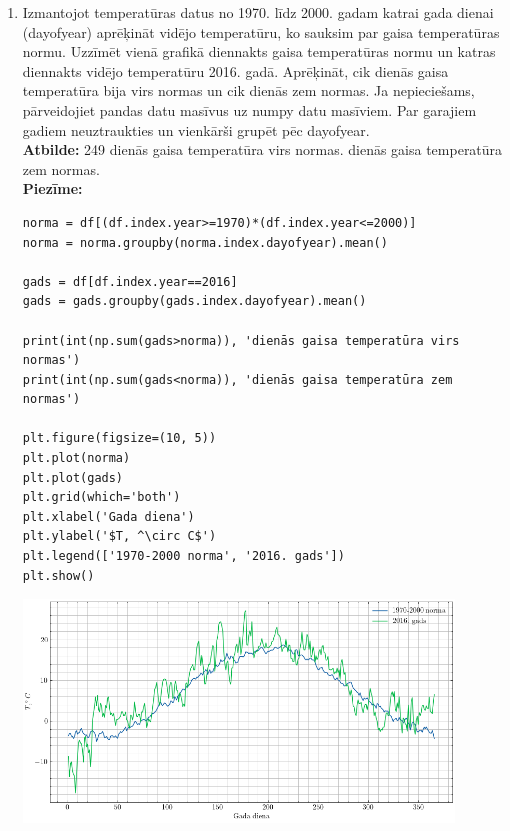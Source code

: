 \documentclass[12pt]{article}
\begin{document}
\begin{enumerate}
        \textbf{Piezīme:}
\begin{verbatim}
df2 = df.resample('d').max()
df2 = df2.resample('y').mean()

plt.figure(figsize=(5,5))
plt.plot(df2)
plt.grid(which='both')
plt.xlabel('Gads')
plt.ylabel('$T, ^\circ C$')
plt.show()
\end{verbatim}
        \item Izmantojot temperatūras datus no 1970. līdz 2000. gadam katrai gada dienai (dayofyear) aprēķināt vidējo temperatūru, ko sauksim par gaisa temperatūras normu. Uzzīmēt vienā grafikā diennakts gaisa temperatūras normu un katras diennakts vidējo temperatūru 2016. gadā. Aprēķināt, cik dienās gaisa temperatūra bija virs normas un cik dienās zem normas. Ja nepieciešams, pārveidojiet pandas datu masīvus uz numpy datu masīviem. Par garajiem gadiem neuztraukties un vienkārši grupēt pēc dayofyear.\\

        \textbf{Atbilde:} 249 dienās gaisa temperatūra virs normas.  dienās gaisa temperatūra zem normas.\\
        \textbf{Piezīme:}
\begin{verbatim}
norma = df[(df.index.year>=1970)*(df.index.year<=2000)]
norma = norma.groupby(norma.index.dayofyear).mean()

gads = df[df.index.year==2016]
gads = gads.groupby(gads.index.dayofyear).mean()

print(int(np.sum(gads>norma)), 'dienās gaisa temperatūra virs normas')
print(int(np.sum(gads<norma)), 'dienās gaisa temperatūra zem normas')

plt.figure(figsize=(10, 5))
plt.plot(norma)
plt.plot(gads)
plt.grid(which='both')
plt.xlabel('Gada diena')
plt.ylabel('$T, ^\circ C$')
plt.legend(['1970-2000 norma', '2016. gads'])
plt.show()
\end{verbatim}
        \includegraphics[width=0.9\textwidth]{5.uzd..png}
    \end{enumerate}
\end{document}

